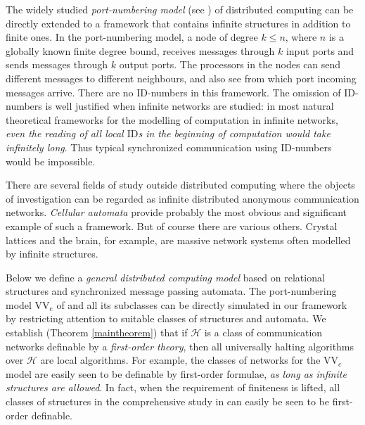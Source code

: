 \documentclass[copyright,creativecommons]{eptcs}
\begin{document}
The widely studied \emph{port-numbering model} (see \cite{angluin, hella, hella2})
of distributed computing can be directly extended to a framework that contains infinite structures
in addition to finite ones.
In the port-numbering model, a node of degree $k\leq n$, where $n$ is a globally known
finite degree bound, receives messages through $k$ input ports
and sends messages through $k$ output ports.
The processors in the nodes can send different messages to different neighbours,
and also see from which port incoming messages arrive.
There are no $\mathrm{ID}$-numbers 
in this framework. The omission of $\mathrm{ID}$-numbers is well justified when infinite
networks are studied: in most natural theoretical frameworks for the
modelling of computation in infinite networks,
\emph{even the reading of all local $\mathrm{ID}$s in the 
beginning of computation would take infinitely long}. Thus typical synchronized
communication using $\mathrm{ID}$-numbers would be impossible.




There are several fields of study outside distributed computing
where the objects of investigation can be regarded as infinite
distributed anonymous communication networks.
\emph{Cellular automata}
provide probably the most
obvious and significant example of such a framework.
But of course there are various others.
Crystal lattices and the brain, for example, are 
massive network systems often modelled by infinite structures.




Below we define a \emph{general  
distributed computing model} based on relational structures and synchronized message passing automata.
The port-numbering model $\mathrm{VV_c}$ of \cite{hella, hella2} and all its subclasses can be directly
simulated in our framework by restricting attention to suitable
classes of structures and automata.
We establish (Theorem \ref{maintheorem}\hspace{0.4mm}) that if $\mathcal{H}$ is a class of
communication networks definable by a 
\emph{first-order theory}, then all universally halting algorithms over $\mathcal{H}$ are local algorithms.
For example, the classes of networks for the $\mathrm{VV}_c$ model are easily seen to be definable by
first-order formulae, \emph{as long as infinite structures are allowed}.
In fact, when the requirement of finiteness is lifted,
all classes of structures in the comprehensive study
in \cite{hella, hella2} can easily be seen to be first-order definable.
\end{document}
